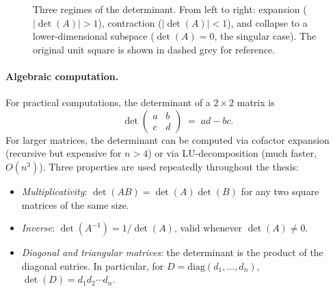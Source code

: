 \documentclass[11pt, a4paper, oneside]{article}
\begin{document}
\begin{figure}[H]
\caption{Three regimes of the determinant. From left to right:
expansion ($|\det(A)| > 1$), contraction ($|\det(A)| < 1$), and
collapse to a lower-dimensional subspace ($\det(A) = 0$, the
singular case). The original unit square is shown in dashed grey for
reference.}
\label{fig:determinant-three-cases}
\end{figure}

\paragraph{Algebraic computation.}
For practical computations, the determinant of a $2 \times 2$ matrix is
\[
\det\!\begin{pmatrix} a & b \\ c & d \end{pmatrix} \;=\; ad - bc.
\]
For larger matrices, the determinant can be computed via cofactor
expansion (recursive but expensive for $n > 4$) or via
LU-decomposition (much faster, $O(n^3)$). Three properties are used
repeatedly throughout the thesis:
\begin{itemize}[leftmargin=1.5em, itemsep=2pt]
    \item \emph{Multiplicativity}: $\det(AB) = \det(A) \det(B)$ for any
          two square matrices of the same size.
    \item \emph{Inverse}: $\det(A^{-1}) = 1/\det(A)$, valid whenever
          $\det(A) \neq 0$.
    \item \emph{Diagonal and triangular matrices}: the determinant is
          the product of the diagonal entries. In particular, for
          $D = \mathrm{diag}(d_1, \ldots, d_n)$,
          $\det(D) = d_1 d_2 \cdots d_n$.
\end{itemize}
\end{document}
